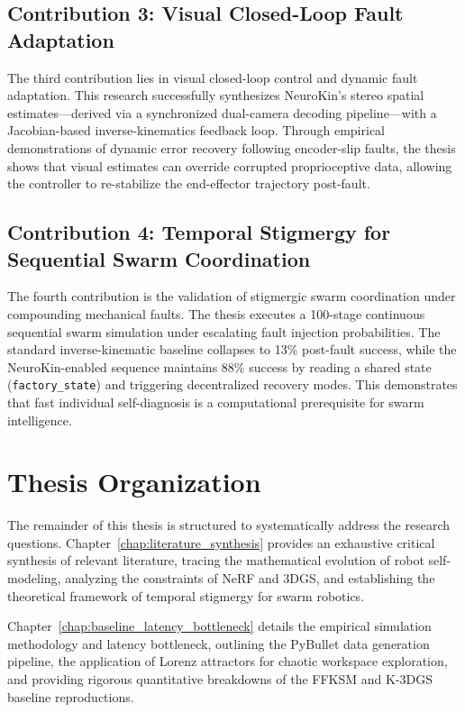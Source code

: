 \documentclass[12pt,a4paper,oneside]{report}
\begin{document}
\subsection{Contribution 3: Visual Closed-Loop Fault Adaptation}
\label{subsec:contrib_closed_loop}

The third contribution lies in visual closed-loop control and dynamic fault adaptation. This research successfully synthesizes NeuroKin's stereo spatial estimates—derived via a synchronized dual-camera decoding pipeline—with a Jacobian-based inverse-kinematics feedback loop. Through empirical demonstrations of dynamic error recovery following encoder-slip faults, the thesis shows that visual estimates can override corrupted proprioceptive data, allowing the controller to re-stabilize the end-effector trajectory post-fault.

\subsection{Contribution 4: Temporal Stigmergy for Sequential Swarm Coordination}
\label{subsec:contrib_stigmergy}

The fourth contribution is the validation of stigmergic swarm coordination under compounding mechanical faults. The thesis executes a 100-stage continuous sequential swarm simulation under escalating fault injection probabilities. The standard inverse-kinematic baseline collapses to 13\% post-fault success, while the NeuroKin-enabled sequence maintains 88\% success by reading a shared state (\texttt{factory\_state}) and triggering decentralized recovery modes. This demonstrates that fast individual self-diagnosis is a computational prerequisite for swarm intelligence.

\section{Thesis Organization}
\label{sec:thesis_organization}

The remainder of this thesis is structured to systematically address the research questions. Chapter~\ref{chap:literature_synthesis} provides an exhaustive critical synthesis of relevant literature, tracing the mathematical evolution of robot self-modeling, analyzing the constraints of NeRF and 3DGS, and establishing the theoretical framework of temporal stigmergy for swarm robotics.

Chapter~\ref{chap:baseline_latency_bottleneck} details the empirical simulation methodology and latency bottleneck, outlining the PyBullet data generation pipeline, the application of Lorenz attractors for chaotic workspace exploration, and providing rigorous quantitative breakdowns of the FFKSM and K-3DGS baseline reproductions.
\end{document}
